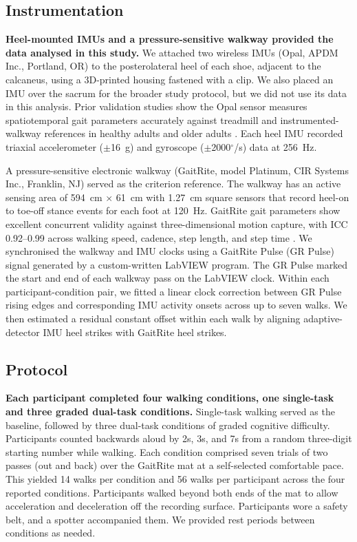 \documentclass[fleqn,10pt,lineno]{wlpeerj}
\newcommand{\dps}{$^{\circ}$/s}
\begin{document}
\subsection{Instrumentation}

\textbf{Heel-mounted IMUs and a pressure-sensitive walkway provided the data analysed in this study.}
We attached two wireless IMUs (Opal, APDM Inc., Portland, OR) to the posterolateral heel of each shoe, adjacent to the calcaneus, using a 3D-printed housing fastened with a clip. We also placed an IMU over the sacrum for the broader study protocol, but we did not use its data in this analysis. Prior validation studies show the Opal sensor measures spatiotemporal gait parameters accurately against treadmill and instrumented-walkway references in healthy adults and older adults \citep{Washabaugh2017, Morris2019}. Each heel IMU recorded triaxial accelerometer ($\pm$16~g) and gyroscope ($\pm$2000\dps) data at 256~Hz.

A pressure-sensitive electronic walkway (GaitRite, model Platinum, CIR Systems Inc., Franklin, NJ) served as the criterion reference. The walkway has an active sensing area of 594~cm $\times$ 61~cm with 1.27~cm square sensors that record heel-on to toe-off stance events for each foot at 120~Hz. GaitRite gait parameters show excellent concurrent validity against three-dimensional motion capture, with ICC 0.92--0.99 across walking speed, cadence, step length, and step time \citep{Webster2005}. We synchronised the walkway and IMU clocks using a GaitRite Pulse (GR Pulse) signal generated by a custom-written LabVIEW program. The GR Pulse marked the start and end of each walkway pass on the LabVIEW clock. Within each participant-condition pair, we fitted a linear clock correction between GR Pulse rising edges and corresponding IMU activity onsets across up to seven walks. We then estimated a residual constant offset within each walk by aligning adaptive-detector IMU heel strikes with GaitRite heel strikes.

\subsection{Protocol}

\textbf{Each participant completed four walking conditions, one single-task and three graded dual-task conditions.}
Single-task walking served as the baseline, followed by three dual-task conditions of graded cognitive difficulty. Participants counted backwards aloud by 2s, 3s, and 7s from a random three-digit starting number while walking. Each condition comprised seven trials of two passes (out and back) over the GaitRite mat at a self-selected comfortable pace. This yielded 14 walks per condition and 56 walks per participant across the four reported conditions. Participants walked beyond both ends of the mat to allow acceleration and deceleration off the recording surface. Participants wore a safety belt, and a spotter accompanied them. We provided rest periods between conditions as needed.
\end{document}
